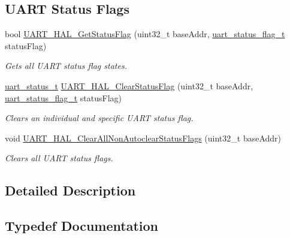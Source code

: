 \subsection*{U\+A\+RT Status Flags}
\begin{DoxyCompactItemize}
\item 
bool \hyperlink{group__uart__hal_gaec59d68fb8fed28c1d0da106f4949647}{U\+A\+R\+T\+\_\+\+H\+A\+L\+\_\+\+Get\+Status\+Flag} (uint32\+\_\+t base\+Addr, \hyperlink{group__uart__hal_gab5a3fa1c858501bdf99d5f46bdb18672}{uart\+\_\+status\+\_\+flag\+\_\+t} status\+Flag)
\begin{DoxyCompactList}\small\item\em Gets all U\+A\+RT status flag states. \end{DoxyCompactList}\item 
\hyperlink{group__uart__hal_ga90effa380d181d660c1bb449977e1535}{uart\+\_\+status\+\_\+t} \hyperlink{group__uart__hal_gac6f42aead3e964c9f33f5ba48de26fae}{U\+A\+R\+T\+\_\+\+H\+A\+L\+\_\+\+Clear\+Status\+Flag} (uint32\+\_\+t base\+Addr, \hyperlink{group__uart__hal_gab5a3fa1c858501bdf99d5f46bdb18672}{uart\+\_\+status\+\_\+flag\+\_\+t} status\+Flag)
\begin{DoxyCompactList}\small\item\em Clears an individual and specific U\+A\+RT status flag. \end{DoxyCompactList}\item 
void \hyperlink{group__uart__hal_gab72177b21e6b5202d8d140f48db9048a}{U\+A\+R\+T\+\_\+\+H\+A\+L\+\_\+\+Clear\+All\+Non\+Autoclear\+Status\+Flags} (uint32\+\_\+t base\+Addr)
\begin{DoxyCompactList}\small\item\em Clears all U\+A\+RT status flags. \end{DoxyCompactList}\end{DoxyCompactItemize}


\subsection{Detailed Description}


\subsection{Typedef Documentation}
